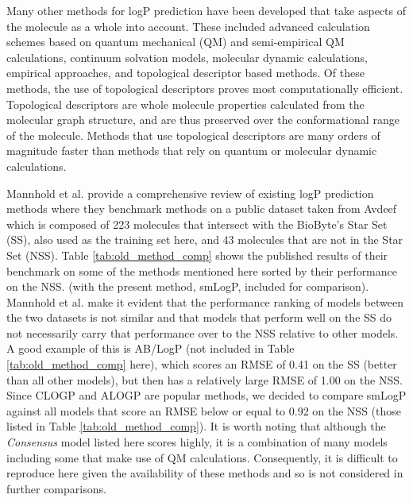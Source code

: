 \documentclass[10pt]{bmc_article}
\newenvironment{bmcformat}{\begin{raggedright}\baselineskip20pt\sloppy\setboolean{publ}{false}}{\end{raggedright}\baselineskip20pt\sloppy}
\begin{document}
\begin{bmcformat}
Many other methods for logP prediction have been developed that take aspects of the molecule as a whole into account\cite{buchwald_octanol-water_1998}. These included advanced calculation schemes based on quantum mechanical (QM) and semi-empirical QM calculations, continuum solvation models, molecular dynamic calculations, empirical approaches, and topological descriptor based methods\cite{mannhold_calculation_2009}. Of these methods, the use of topological descriptors proves most computationally efficient. Topological descriptors are whole molecule properties calculated from the molecular graph structure, and are thus preserved over the conformational range of the molecule. Methods that use topological descriptors are many orders of magnitude faster than methods that rely on quantum or molecular dynamic calculations.

Mannhold et al. \cite{mannhold_calculation_2009} provide a comprehensive review of existing logP prediction methods where they benchmark methods on a public dataset taken from Avdeef \cite{avdeef_absorption_2012} which is composed of 223 molecules that intersect with the BioByte's Star Set (SS), also used as the training set here, and 43 molecules that are not in the Star Set (NSS). Table \ref{tab:old_method_comp} shows the published results of their benchmark on some of the methods mentioned here sorted by their performance on the NSS. (with the present method, smLogP, included for comparison). Mannhold et al. \cite{mannhold_calculation_2009} make it evident that the performance ranking of models between the two datasets is not similar and that models that perform well on the SS do not necessarily carry that performance over to the NSS relative to other models. A good example of this is AB/LogP (not included in Table \ref{tab:old_method_comp} here), which scores an RMSE of 0.41 on the SS (better than all other models), but then has a relatively large RMSE of 1.00 on the NSS. Since CLOGP and ALOGP are popular methods, we decided to compare smLogP against all models that score an RMSE below or equal to 0.92 on the NSS (those listed in Table \ref{tab:old_method_comp}). It is worth noting that although the \textit{Consensus} model listed here scores highly, it is a combination of many models including some that make use of QM calculations. Consequently, it is difficult to reproduce here given the availability of these methods and so is not considered in further comparisons.


\end{bmcformat}
\end{document}
